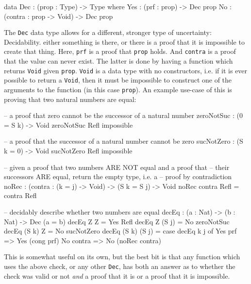 	\begin{code}[caption={\texttt{Dec} as defined in the \Idris prelude}]
        data Dec : (prop : Type) -> Type where
             Yes : (prf : prop) -> Dec prop
             No  : (contra : prop -> Void) -> Dec prop
	\end{code}

    The \texttt{Dec} data type allows for a different, stronger type of uncertainty: Decidability.
     either something is there, or there is a proof that it is impossible to create that thing.
    Here, \texttt{prf} is a proof that \texttt{prop} holds. And \texttt{contra} is a proof that the value can never exist. The latter is done by having a function which returns \texttt{Void} given \texttt{prop}. \texttt{Void} is a data type with no constructors, i.e. if it is ever possible to return a \texttt{Void}, then it must be impossible to construct one of the arguments to the function (in this case \texttt{prop}). An example use-case of this is proving that two natural numbers are equal:
	\begin{code}[caption={Proving the equality between natural numbers \cite{brady_2017}},label={lst:decEq}]
    -- a proof that zero cannot be the successor of a natural number
    zeroNotSuc : (0 = S k) -> Void
    zeroNotSuc Refl impossible
    
    -- a proof that the successor of a natural number cannot be zero
    sucNotZero : (S k = 0) -> Void
    sucNotZero Refl impossible
    
    -- given a proof that two numbers ARE NOT equal and a proof that
    -- their successors ARE equal, return the empty type, i.e. a
    -- proof by contradiction
    noRec : (contra : (k = j) -> Void) -> (S k = S j) -> Void
    noRec contra Refl = contra Refl

    -- decidably describe whether two numbers are equal
    decEq : (a : Nat) -> (b : Nat) -> Dec (a = b)
    decEq Z Z = Yes Refl
    decEq Z (S j) = No zeroNotSuc
    decEq (S k) Z = No sucNotZero
    decEq (S k) (S j) = case decEq k j of
                            Yes prf => Yes (cong prf)
                            No contra => No (noRec contra)
	\end{code}
    This is somewhat useful on its own, but the best bit is that any function which uses the above check, or any other \texttt{Dec}, has both an answer as to whether the check was valid or not \textit{and} a proof that it is or a proof that it is impossible.

